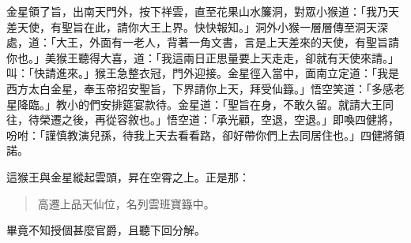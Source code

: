 金星領了旨，出南天門外，按下祥雲，直至花果山水簾洞，對眾小猴道：「我乃天差天使，有聖旨在此，請你大王上界。快快報知。」洞外小猴一層層傳至洞天深處，道：「大王，外面有一老人，背著一角文書，言是上天差來的天使，有聖旨請你也。」美猴王聽得大喜，道：「我這兩日正思量要上天走走，卻就有天使來請。」叫：「快請進來。」猴王急整衣冠，門外迎接。金星徑入當中，面南立定道：「我是西方太白金星，奉玉帝招安聖旨，下界請你上天，拜受仙籙。」悟空笑道：「多感老星降臨。」教小的們安排筵宴款待。金星道：「聖旨在身，不敢久留。就請大王同往，待榮遷之後，再從容敘也。」悟空道：「承光顧，空退，空退。」即喚四健將，吩咐：「謹慎教演兒孫，待我上天去看看路，卻好帶你們上去同居住也。」四健將領諾。

這猴王與金星縱起雲頭，昇在空霄之上。正是那：
\begin{quote}
高遷上品天仙位，名列雲班寶籙中。
\end{quote}

畢竟不知授個甚麼官爵，且聽下回分解。
